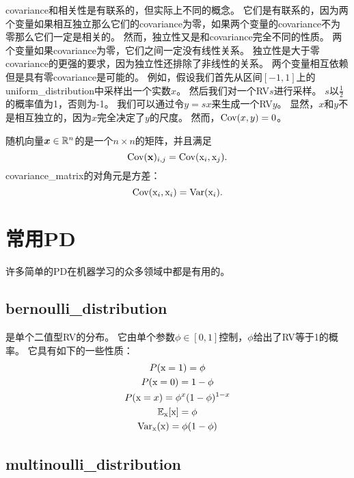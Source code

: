 \gls{covariance}和相关性是有联系的，但实际上不同的概念。
它们是有联系的，因为两个变量如果相互独立那么它们的\gls{covariance}为零，如果两个变量的\gls{covariance}不为零那么它们一定是相关的。
然而，独立性又是和\gls{covariance}完全不同的性质。
两个变量如果\gls{covariance}为零，它们之间一定没有线性关系。
独立性是大于零\gls{covariance}的更强的要求，因为独立性还排除了非线性的关系。
两个变量相互依赖但是具有零\gls{covariance}是可能的。
例如，假设我们首先从区间$[-1, 1]$上的\gls{uniform_distribution}中采样出一个实数$x$。
然后我们对一个\gls{RV}$s$进行采样。
$s$以$\frac{1}{2}$的概率值为1，否则为-1。
我们可以通过令$y=sx$来生成一个\gls{RV}$y$。
显然，$x$和$y$不是相互独立的，因为$x$完全决定了$y$的尺度。
然而，$\text{Cov}(x,y)=0$。


随机向量$\bm{x}\in \mathbb{R}^n$的是一个$n\times n$的矩阵，并且满足
\begin{equation}
\text{Cov}(\mathbf{x})_{i,j} = \text{Cov}(\mathrm{x}_i, \mathrm{x}_j).
\end{equation}
\gls{covariance_matrix}的对角元是方差：
\begin{equation}
\text{Cov}(\mathrm{x}_i, \mathrm{x}_i) = \text{Var}(\mathrm{x}_i).
\end{equation}

\section{常用\gls{PD}}
\label{sec:common_probability_distributions}

许多简单的\gls{PD}在机器学习的众多领域中都是有用的。

\subsection{\gls{bernoulli_distribution}}
\label{sec:bernoulli_distribution}

是单个二值型\gls{RV}的分布。
它由单个参数$\phi \in [0, 1]$控制，$\phi$给出了\gls{RV}等于1的概率。
它具有如下的一些性质：
\begin{gather}
P(\mathrm{x} =1) = \phi\\
P(\mathrm{x} =0) = 1-\phi\\
P(\mathrm{x} = x) = \phi^x (1-\phi)^{1-x}\\
\mathbb{E}_{\mathrm{x}}[\mathrm{x}] = \phi\\
\text{Var}_{\mathrm{x}}(\mathrm{x}) = \phi(1-\phi)
\end{gather}

\subsection{\gls{multinoulli_distribution}}
\label{sec:multinoulli_distribution}

